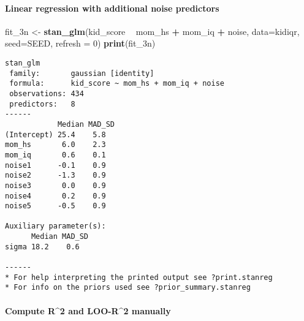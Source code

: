 \documentclass[
]{article}
\newenvironment{Shaded}{\begin{snugshade}}{\end{snugshade}}
\newcommand{\DataTypeTok}[1]{\textcolor[rgb]{0.13,0.29,0.53}{#1}}
\newcommand{\DecValTok}[1]{\textcolor[rgb]{0.00,0.00,0.81}{#1}}
\newcommand{\KeywordTok}[1]{\textcolor[rgb]{0.13,0.29,0.53}{\textbf{#1}}}
\newcommand{\NormalTok}[1]{#1}
\newcommand{\OperatorTok}[1]{\textcolor[rgb]{0.81,0.36,0.00}{\textbf{#1}}}
\newcommand{\StringTok}[1]{\textcolor[rgb]{0.31,0.60,0.02}{#1}}
\begin{document}
\hypertarget{linear-regression-with-additional-noise-predictors}{%
\paragraph{Linear regression with additional noise
predictors}\label{linear-regression-with-additional-noise-predictors}}

\begin{Shaded}
\begin{Highlighting}[]
\NormalTok{fit_3n <-}\StringTok{ }\KeywordTok{stan_glm}\NormalTok{(kid_score }\OperatorTok{~}\StringTok{ }\NormalTok{mom_hs }\OperatorTok{+}\StringTok{ }\NormalTok{mom_iq }\OperatorTok{+}\StringTok{ }\NormalTok{noise, }\DataTypeTok{data=}\NormalTok{kidiqr,}
                   \DataTypeTok{seed=}\NormalTok{SEED, }\DataTypeTok{refresh =} \DecValTok{0}\NormalTok{)}
\KeywordTok{print}\NormalTok{(fit_3n)}
\end{Highlighting}
\end{Shaded}

\begin{verbatim}
stan_glm
 family:       gaussian [identity]
 formula:      kid_score ~ mom_hs + mom_iq + noise
 observations: 434
 predictors:   8
------
            Median MAD_SD
(Intercept) 25.4    5.8  
mom_hs       6.0    2.3  
mom_iq       0.6    0.1  
noise1      -0.1    0.9  
noise2      -1.3    0.9  
noise3       0.0    0.9  
noise4       0.2    0.9  
noise5      -0.5    0.9  

Auxiliary parameter(s):
      Median MAD_SD
sigma 18.2    0.6  

------
* For help interpreting the printed output see ?print.stanreg
* For info on the priors used see ?prior_summary.stanreg
\end{verbatim}

\hypertarget{compute-r2-and-loo-r2-manually-1}{%
\paragraph{Compute R\^{}2 and LOO-R\^{}2
manually}\label{compute-r2-and-loo-r2-manually-1}}

\begin{Shaded}
\end{Shaded}
\end{document}
